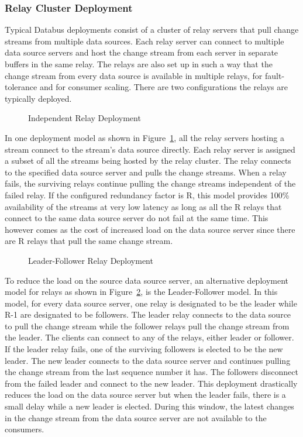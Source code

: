 \subsubsection{Relay Cluster Deployment}

Typical Databus deployments consist of a cluster of relay servers that pull change streams from multiple data sources. Each relay server can connect to multiple data source servers and host the change stream from each server in separate buffers in the same relay. The relays are also set up in such a way that the change stream from every data source is available in multiple relays, for fault-tolerance and for consumer scaling. There are two configurations the relays are typically deployed.

\begin{figure}
\centering
{}
\caption{Independent Relay Deployment}
\label{fig:RelayDeployment1}
\end{figure}

In one deployment model as shown in Figure~\ref{fig:RelayDeployment1}, all the relay servers hosting a stream connect to the stream's data source directly. Each relay server is assigned a subset of all the streams being hosted by the relay cluster. The relay connects to the specified data source server and pulls the change streams. When a relay fails, the surviving relays continue pulling the change streams independent of the failed relay. If the configured redundancy factor is R, this model provides 100\% availability of the streams at very low latency as long as all the R relays that connect to the same data source server do not fail at the same time. This however comes as the cost of increased load on the data source server since there are R relays that pull the same change stream.

\begin{figure}
\centering
{}
\caption{Leader-Follower Relay Deployment}
\label{fig:RelayDeployment2}
\end{figure}

To reduce the load on the source data source server, an alternative deployment model for relays as shown in Figure~\ref{fig:RelayDeployment2}, is the Leader-Follower model. In this model, for every data source server, one relay is designated to be the leader while R-1 are designated to be followers. The leader relay connects to the data source to pull the change stream while the follower relays pull the change stream from the leader. The clients can connect to any of the relays, either leader or follower. If the leader relay fails, one of the surviving followers is elected to be the new leader. The new leader connects to the data source server and continues pulling the change stream from the last sequence number it has. The followers disconnect from the failed leader and connect to the new leader. This deployment drastically reduces the load on the data source server but when the leader fails, there is a small delay while a new leader is elected. During this window, the latest changes in the change stream from the data source server are not available to the consumers.

